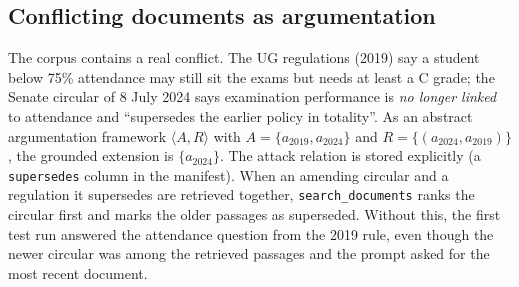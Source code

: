\documentclass[11pt,a4paper]{article}
\begin{document}
\subsection{Conflicting documents as argumentation}\label{sec:argumentation}
The corpus contains a real conflict. The UG regulations (2019) say a student below 75\% attendance may
still sit the exams but needs at least a C grade; the Senate circular of 8 July 2024 says examination
performance is \emph{no longer linked} to attendance and ``supersedes the earlier policy in totality''.
As an abstract argumentation framework $\langle A,R\rangle$ with $A=\{a_{2019},a_{2024}\}$ and
$R=\{(a_{2024},a_{2019})\}$, the grounded extension is $\{a_{2024}\}$. The attack relation is stored
explicitly (a \texttt{supersedes} column in the manifest). When an amending circular and a regulation it
supersedes are retrieved together, \texttt{search\_documents} ranks the circular first and marks the older
passages as superseded. Without this, the first test run answered the attendance question from the 2019 rule,
even though the newer circular was among the retrieved passages and the prompt asked for the most recent document.

\end{document}
